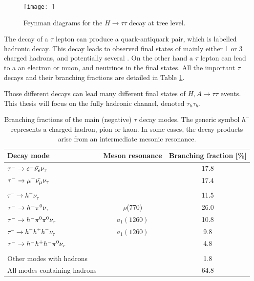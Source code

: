\begin{figure}
    \centering
    \texttt{[image: ]}
    \caption{Feynman diagrams for the $H \rightarrow \tau\tau$ decay at tree level.}
    \label{fig:htt}
\end{figure}

The decay of a $\tau$ lepton can produce a quark-antiquark pair, which is labelled hadronic decay. This decay leads to observed final states of mainly either 1 or 3 charged hadrons, and potentially several \pizero. On the other hand a $\tau$ lepton can lead to a an electron or muon, and neutrinos in the final states. All the important $\tau$ decays and their branching fractions are detailed in Table \ref{tab:tau_decay_products}. 

Those different decays can lead many different final states of $H,A \rightarrow \tau\tau$ events. This thesis will focus on the fully hadronic channel, denoted $\tau_h \tau_h$.


\begin{table}[]
    \centering
    \begin{tabular}{l c c}
        \hline
         Decay mode & Meson resonance & Branching fraction [\%] \\
         \hline
         $\tau^- \rightarrow e^- \Bar{\nu_e} \nu_\tau$ & & 17.8 \\
         $\tau^- \rightarrow \mu^- \Bar{\nu_\mu} \nu_\tau$ & & 17.4 \\
         & &  \\
         $\tau^- \rightarrow h^- \nu_\tau$ & & 11.5 \\
         $\tau^- \rightarrow h^- \pi^{0} \nu_\tau$ & $\rho$(770) & 26.0 \\
         $\tau^- \rightarrow h^- \pi^{0} \pi^{0} \nu_\tau$ & $a_1(1260)$ & 10.8 \\
         $\tau^- \rightarrow h^- h^+ h^- \nu_\tau$ & $a_1(1260)$ & 9.8 \\
         $\tau^- \rightarrow h^- h^+ h^- \pi^{0} \nu_\tau$ & & 4.8 \\
         & &  \\
         Other modes with hadrons & & 1.8 \\
         All modes containing hadrons & & 64.8 \\
         \hline
    \end{tabular}
    \caption{Branching fractions of the main (negative) $\tau$ decay modes. The generic symbol $h^-$ represents a charged hadron, pion or kaon. In some cases, the decay products arise from an intermediate mesonic resonance.}
    \label{tab:tau_decay_products}
\end{table}
